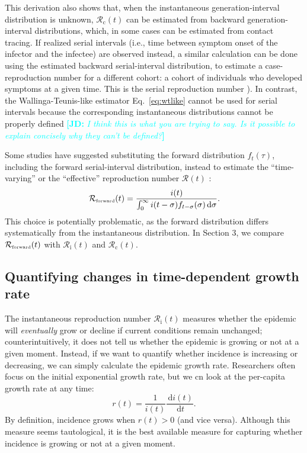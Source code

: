 \documentclass[12pt]{article}
\newcommand{\comment}{\showcomment}
\newcommand{\showcomment}[3]{\textcolor{#1}{\textbf{[#2: }\textsl{#3}\textbf{]}}}
\newcommand{\jd}[1]{\comment{cyan}{JD}{#1}}
\newcommand{\eref}[1]{Eq.~\ref{eq:#1}}
\newcommand{\Rx}[1]{\ensuremath{{\mathcal R}_{#1}}\xspace}
\newcommand{\Rc}{\Rx{\mathrm{c}}}
\newcommand{\Ri}{\Rx{\mathrm{i}}}
\newcommand{\RR}{\ensuremath{{\mathcal R}}\xspace}
\newcommand{\tsub}[2]{#1_{{\textrm{\tiny #2}}}}
\newcommand{\dd}[1]{\ensuremath{\, \mathrm{d}#1}}
\newcommand{\dsigma}{\dd{\sigma}}
\begin{document}
This derivation also shows that, when the instantaneous generation-interval distribution is unknown, $\Rc(t)$ can be estimated from backward generation-interval distributions, which, in some cases can be estimated from contact tracing.
If realized serial intervals (i.e., time between symptom onset of the infector and the infectee) are observed instead, a similar calculation can be done using the estimated backward serial-interval distribution, to estimate a case-reproduction number for a different cohort: a cohort of individuals who developed symptoms at a given time. This is the serial reproduction number \cite{park2020forward}).
In contrast, the Wallinga-Teunis-like estimator \eref{wtlike} cannot be used for serial intervals because the corresponding instantaneous distributions cannot be properly defined \jd{I think this is what you are trying to say. Is it possible to explain concisely why they can't be defined?}

Some studies have suggested substituting the forward distribution $f_t(\tau)$, including the forward serial-interval distribution, instead to estimate the ``time-varying'' or the ``effective'' reproduction number $\RR(t)$ \citep{liu2018measurability, ali2020serial}:
\begin{equation}
\tsub{\RR}{forward}(t) = \frac{i(t)}{\int_0^\infty i(t-\sigma) f_{t-\sigma}(\sigma) \dsigma}.
\end{equation}
This choice is potentially problematic, as the forward distribution differs systematically from the instantaneous distribution.
In Section 3, we compare $\tsub{\RR}{forward}(t)$ with $\Ri(t)$ and $\Rc(t)$.

\subsection{Quantifying changes in time-dependent growth rate}

The instantaneous reproduction number $\Ri(t)$ measures whether the epidemic will \emph{eventually} grow or decline if current conditions remain unchanged;
counterintuitively, it does not tell us whether the epidemic is growing or not at a given moment.
Instead, if we want to quantify whether incidence is increasing or decreasing, we can simply calculate the epidemic growth rate.
Researchers often focus on the initial exponential growth rate, but we cn look at the per-capita growth rate at any time:
\begin{equation}
r(t) = \frac{1}{i(t)} \frac{\dd{i(t)}}{\dd{t}}.
\end{equation}
By definition, incidence grows when $r(t) > 0$ (and vice versa).
Although this measure seems tautological, it is the best available measure for capturing whether incidence is growing or not at a given moment.
\end{document}
